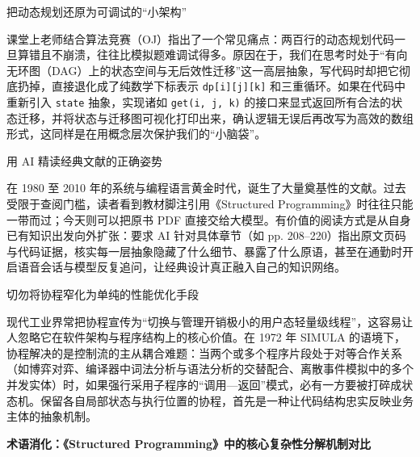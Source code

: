 \documentclass[UTF8,a4paper,11pt,fontset=fandol]{ctexart}
\begin{document}
\begin{importantbox}{把动态规划还原为可调试的“小架构”}

课堂上老师结合算法竞赛（OJ）指出了一个常见痛点：两百行的动态规划代码一旦算错且不崩溃，往往比模拟题难调试得多。原因在于，我们在思考时处于“有向无环图（DAG）上的状态空间与无后效性迁移”这一高层抽象，写代码时却把它彻底扔掉，直接退化成了纯数学下标表示 \texttt{dp[i][j][k]} 和三重循环。如果在代码中重新引入 \texttt{state} 抽象，实现诸如 \texttt{get(i, j, k)} 的接口来显式返回所有合法的状态迁移，并将状态与迁移图可视化打印出来，确认逻辑无误后再改写为高效的数组形式，这同样是在用概念层次保护我们的“小脑袋”。

\end{importantbox}

\begin{knowledgebox}{用 AI 精读经典文献的正确姿势}

在 1980 至 2010 年的系统与编程语言黄金时代，诞生了大量奠基性的文献。过去受限于查阅门槛，读者看到教材脚注引用《Structured Programming》时往往只能一带而过；今天则可以把原书 PDF 直接交给大模型。有价值的阅读方式是从自身已有知识出发向外扩张：要求 AI 针对具体章节（如 pp. 208–220）指出原文页码与代码证据，核实每一层抽象隐藏了什么细节、暴露了什么原语，甚至在通勤时开启语音会话与模型反复追问，让经典设计真正融入自己的知识网络。

\end{knowledgebox}

\begin{warningbox}{切勿将协程窄化为单纯的性能优化手段}

现代工业界常把协程宣传为“切换与管理开销极小的用户态轻量级线程”，这容易让人忽略它在软件架构与程序结构上的核心价值。在 1972 年 SIMULA 的语境下，协程解决的是控制流的主从耦合难题：当两个或多个程序片段处于对等合作关系（如博弈对弈、编译器中词法分析与语法分析的交替配合、离散事件模拟中的多个并发实体）时，如果强行采用子程序的“调用—返回”模式，必有一方要被打碎成状态机。保留各自局部状态与执行位置的协程，首先是一种让代码结构忠实反映业务主体的抽象机制。

\end{warningbox}

\par{}\textbf{术语消化：《Structured Programming》中的核心复杂性分解机制对比}
\end{document}
